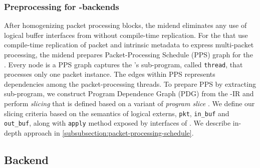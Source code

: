 \documentclass[letterpaper,twocolumn,10pt]{article}
\begin{document}
\subsubsection{Preprocessing for \ucomp-backends}
After homogenizing packet processing blocks, the midend eliminates 
any use of logical buffer interfaces from \uprograms without 
compile-time replication. For the \uprogram that use compile-time 
replication of packet and intrinsic metadata to express multi-packet 
processing, the midend prepares Packet-Processing Schedule (PPS) 
graph for the \uprogram. Every node is a PPS graph captures the 
\uprogram's sub-program, called \texttt{thread}, that processes only 
one packet instance. The edges within PPS represents dependencies 
among the packet-processing threads.
To prepare PPS by extracting sub-program, we construct 
Program Dependence Graph (PDG) \cite{Ferrante:1987:PDG:24039.24041} 
from the \uprogram-IR and perform \emph{slicing} that is defined based 
on a variant of \emph{program slice} 
\cite{Weiser:1981:PS:800078.802557}.
We define our slicing criteria based on the semantics of logical 
externs, \texttt{pkt}, \texttt{in\_buf} and \texttt{out\_buf}, along 
with \texttt{apply} method exposed by interfaces of \uarch. We 
describe in-depth approach in 
\cref{subsubsection:packet-processing-schedule}.







\subsection{\ucomp Backend}
\label{subsection:micro-backend}
\end{document}
